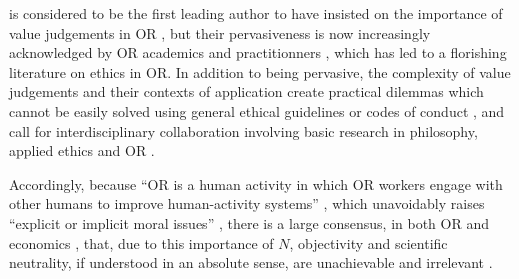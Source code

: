 \documentclass[preprint, french, english, 11pt, authoryear]{elsarticle}%
\begin{document}
\begin{changebar}
\citet{churchman_operations_1970} is considered to be the first leading author to have insisted on the importance of value judgements in \ac{OR} \citep{ormerod_operational_2013}, but their pervasiveness is now increasingly acknowledged by \ac{OR} academics and practitionners \citep{brans_ethics_2007}, which has led to a florishing literature on ethics in \ac{OR}. 
In addition to being pervasive, the complexity of value judgements and their contexts of application create practical dilemmas which cannot be easily solved using general ethical guidelines or codes of conduct \citep{taket_undercover_1994}, and call for interdisciplinary collaboration involving basic research in philosophy, applied ethics and \ac{OR} \citep{picavet_opportunities_2009}. \end{changebar}Accordingly, because ``\ac{OR}  
is a human activity in which \ac{OR} 
workers engage with other humans to improve human-activity systems'' \citep{ormerod_operational_2013}, which unavoidably raises ``explicit or implicit moral issues'' \citep{diekmann_moral_2013}, there is a large consensus, in both \ac{OR} 
\citep[p. 285]{williams_2009} and economics \citep{dwyer_scientific_1985, heath_value_1994, sen_rationality_2004, mongin_value_2006, baujard_value_2013},
that, due to this importance of $N$, objectivity and scientific neutrality, if understood in an absolute sense, are unachievable and irrelevant \citep{le_menestrel_ethics_2004,reisach_creation_2016}. 
\end{document}
